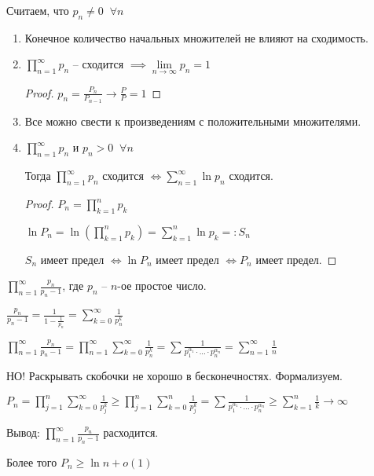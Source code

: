 \begin{properties}\slashns
	
	Считаем, что $p_n \ne 0 \;\; \forall n$
	\begin{enumerate}
		\item Конечное количество начальных множителей не влияют на сходимость.
		\item $\prod\limits_{n=1}^{\infty}p_n$ -- сходится $\implies \lim\limits_{n \to \infty} p_n = 1$
		
		\begin{proof}\slashns
			
			$p_n = \frac{P_n}{P_{n-1}} \to \frac{P}{P} = 1$
		\end{proof}
		
		\item Все можно свести к произведениям с положительными множителями.
		
		\item $\prod\limits_{n=1}^{\infty} p_n$ и $p_n > 0 \;\; \forall n$
		
		Тогда $\prod\limits_{n=1}^{\infty} p_n$ сходится $\iff \sum\limits_{n=1}^{\infty} \ln p_n$ сходится.
		
		\begin{proof}\slashns
			
			$P_n = \prod\limits_{k=1}^{n} p_k$
			
			$\ln P_n = \ln (\prod\limits_{k=1}^{n} p_k) = \sum\limits_{k = 1}^{n} \ln p_k =: S_n$
			
			$S_n $ имеет предел $\iff \ln P_n$ имеет предел $\iff P_n$ имеет предел.
		\end{proof}
	\end{enumerate}
\end{properties}

\begin{example}\slashns
	
	$\prod\limits_{n=1}^{\infty} \frac{p_n}{p_n-1}$, где $p_n$ -- $n$-ое простое число.
	
	$\frac{p_n}{p_n - 1} = \frac{1}{1 - \frac1{p_n}} = \sum\limits_{k=0}^{\infty} \frac1{p_n^k}$
	
	$\prod\limits_{n = 1}^{\infty} \frac{p_n}{p_n - 1} = \prod\limits_{n = 1}^{\infty} \sum\limits_{k=0}^{\infty} \frac1{p_n^k} = \sum \frac{1}{p_1^{\alpha_1}\cdot ...\cdot p_n^{\alpha_n}} = \sum\limits_{n=1}^{\infty} \frac1n$
	
	НО! Раскрывать скобочки не хорошо в бесконечностях. Формализуем.
	
	$P_n = \prod\limits_{j=1}^{n} \sum\limits_{k=0}^{\infty} \frac{1}{p_j^k} \ge \prod\limits_{j=1}^{n} \sum\limits_{k = 0}^{n} \frac1{p_j^k} = \sum \frac{1}{p_1^{\alpha_1}\cdot ...\cdot p_n^{\alpha_n}} \ge \sum\limits_{k = 1}^{n} \frac1k \to \infty$
	
	Вывод: $\prod\limits_{n=1}^{\infty} \frac{p_n}{p_n-1}$ расходится.
	
	Более того $P_n \ge \ln n + o(1)$
\end{example}

